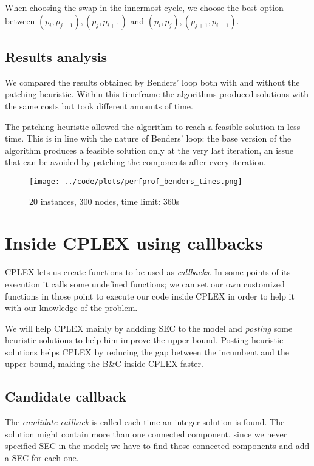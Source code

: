 When choosing the swap in the innermost cycle, we choose the best option between $(p_i,p_{j+1}),(p_j, p_{i+1})$ and $(p_i,p_j), (p_{j+1},p_{i+1})$.

\subsection{Results analysis}

We compared the results obtained by Benders' loop both with and without the patching heuristic. Within this timeframe the algorithms produced solutions with the same costs but took different amounts of time.

The patching heuristic allowed the algorithm to reach a feasible solution in less time. This is in line with the nature of Benders' loop: the base version of the algorithm produces a feasible solution only at the very last iteration, an issue that can be avoided by patching the components after every iteration.

\FloatBarrier
\begin{figure}[h]
    \centering
    \texttt{[image: ../code/plots/perfprof\_benders\_times.png]}
    \caption*{20 instances, 300 nodes, time limit: 360s}
\end{figure}
\FloatBarrier

\section{Inside CPLEX using callbacks}

CPLEX lets us create functions to be used as \textit{callbacks}. In some points of its execution it calls some undefined functions; we can set our own customized functions in those point to execute our code inside CPLEX in order to help it with our knowledge of the problem.

We will help CPLEX mainly by addding SEC to the model and \textit{posting} some heuristic solutions to help him improve the upper bound. Posting heuristic solutions helps CPLEX by reducing the gap between the incumbent and the upper bound, making the B\&C inside CPLEX faster.

\subsection{Candidate callback}
The \textit{candidate callback} is called each time an integer solution is found. The solution might contain more than one connected component, since we never specified SEC in the model; we have to find those connected components and add a SEC for each one.

